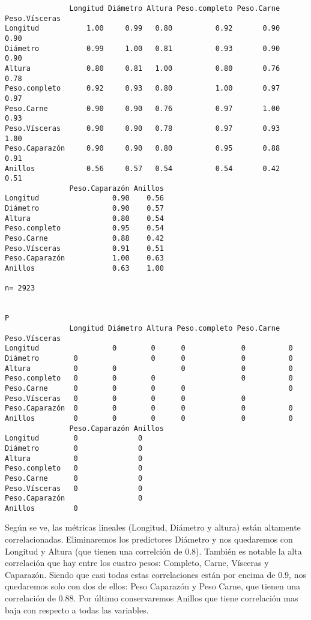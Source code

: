 \documentclass[11pt]{article}
\begin{document}
    
    \begin{verbatim}
               Longitud Diámetro Altura Peso.completo Peso.Carne Peso.Vísceras
Longitud           1.00     0.99   0.80          0.92       0.90          0.90
Diámetro           0.99     1.00   0.81          0.93       0.90          0.90
Altura             0.80     0.81   1.00          0.80       0.76          0.78
Peso.completo      0.92     0.93   0.80          1.00       0.97          0.97
Peso.Carne         0.90     0.90   0.76          0.97       1.00          0.93
Peso.Vísceras      0.90     0.90   0.78          0.97       0.93          1.00
Peso.Caparazón     0.90     0.90   0.80          0.95       0.88          0.91
Anillos            0.56     0.57   0.54          0.54       0.42          0.51
               Peso.Caparazón Anillos
Longitud                 0.90    0.56
Diámetro                 0.90    0.57
Altura                   0.80    0.54
Peso.completo            0.95    0.54
Peso.Carne               0.88    0.42
Peso.Vísceras            0.91    0.51
Peso.Caparazón           1.00    0.63
Anillos                  0.63    1.00

n= 2923 


P
               Longitud Diámetro Altura Peso.completo Peso.Carne Peso.Vísceras
Longitud                 0        0      0             0          0           
Diámetro        0                 0      0             0          0           
Altura          0        0               0             0          0           
Peso.completo   0        0        0                    0          0           
Peso.Carne      0        0        0      0                        0           
Peso.Vísceras   0        0        0      0             0                      
Peso.Caparazón  0        0        0      0             0          0           
Anillos         0        0        0      0             0          0           
               Peso.Caparazón Anillos
Longitud        0              0     
Diámetro        0              0     
Altura          0              0     
Peso.completo   0              0     
Peso.Carne      0              0     
Peso.Vísceras   0              0     
Peso.Caparazón                 0     
Anillos         0                    
    \end{verbatim}

    
    Según se ve, las métricas lineales (Longitud, Diámetro y altura) están
altamente correlacionadas. Eliminaremos los predictores Diámetro y nos
quedaremos con Longitud y Altura (que tienen una correlción de 0.8).
También es notable la alta correlación que hay entre los cuatro pesos:
Completo, Carne, Vísceras y Caparazón. Siendo que casi todas estas
correlaciones están por encima de 0.9, nos quedaremos solo con dos de
ellos: Peso Caparazón y Peso Carne, que tienen una correlación de 0.88.
Por último conservaremos Anillos que tiene correlación mas baja con
respecto a todas las variables.
\end{document}
